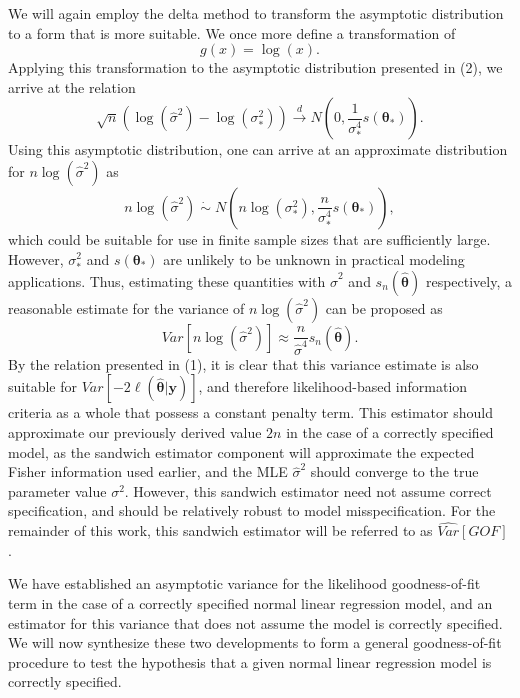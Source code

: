 \documentclass[sn-mathphys-ay]{sn-jnl}
\begin{document}
		We will again employ the delta method to transform the asymptotic distribution to a form that is more suitable. We once more define a transformation of
		\begin{equation*}
			g(x) = \log(x) .
		\end{equation*}
		Applying this transformation to the asymptotic distribution presented in (2), we arrive at the relation
		\begin{equation*}
			\sqrt{n} ( \log (\hat{\sigma}^2) - \log(\sigma_*^2)) \xrightarrow[]{d} N \left( 0, \frac{1}{\sigma_*^4} s(\bm{\theta}_*) \right) .
		\end{equation*}
		Using this asymptotic distribution, one can arrive at an approximate distribution for $n\log(\hat{\sigma}^2)$ as
		\begin{equation*}
			n\log(\hat{\sigma}^2) \; \dot\sim \; N \left( n\log(\sigma_* ^2), \frac{n}{\sigma_*^4} s(\bm{\theta}_*) \right) ,
		\end{equation*}
		which could be suitable for use in finite sample sizes that are sufficiently large. However, $\sigma_*^2$ and $s(\bm{\theta}_*)$ are unlikely to be unknown in practical modeling
		applications. Thus, estimating these quantities with $\hat{\sigma}^2$ and $s_n(\hat{\bm{\theta}})$ respectively, a reasonable estimate for the variance of $n\log(\hat{\sigma}^2)$ can
		be proposed as
		\begin{equation*}
			Var \left[ n\log(\hat{\sigma}^2) \right] \approx \frac{n}{\hat{\sigma}^4} s_n(\hat{\bm{\theta}}) .
		\end{equation*}
		By the relation presented in (1), it is clear that this variance estimate is also suitable for $Var \left[ -2 \ell (\hat{\bm{\theta}} | \bm{y} ) \right]$, and therefore
		likelihood-based information criteria as a whole that possess a constant penalty term. This estimator should approximate our previously derived value $2n$ in the case of a correctly
		specified model, as the sandwich estimator component will approximate the expected Fisher information used earlier, and the MLE $\hat{\sigma}^2$ should converge to the true
		parameter value $\sigma^2$. However, this sandwich estimator need not assume correct specification, and should be relatively robust to model misspecification. For the remainder of this work, this sandwich estimator will be referred to as $\widehat{Var}[GOF]$.

		We have established an asymptotic variance for the likelihood goodness-of-fit term in the case of a correctly specified normal linear regression model, and an
		estimator for this variance that does not assume the model is correctly specified. We will now synthesize these two developments to form a general goodness-of-fit procedure to
		test the hypothesis that a given normal linear regression model is correctly specified.
\end{document}
